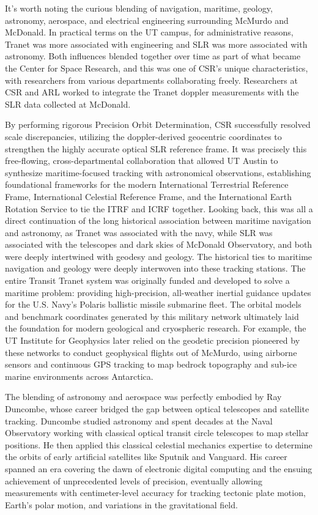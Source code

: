 It’s worth noting the curious blending of navigation, maritime, geology, astronomy, aerospace, and electrical engineering surrounding McMurdo and McDonald. In practical terms on the UT campus, for administrative reasons, Tranet was more associated with engineering and SLR was more associated with astronomy. Both influences blended together over time as part of what became the Center for Space Research, and this was one of CSR’s unique characteristics, with researchers from various departments collaborating freely. Researchers at CSR and ARL worked to integrate the Tranet doppler measurements with the SLR data collected at McDonald. 

By performing rigorous Precision Orbit Determination, CSR successfully resolved scale discrepancies, utilizing the doppler-derived geocentric coordinates to strengthen the highly accurate optical SLR reference frame. It was precisely this free-flowing, cross-departmental collaboration that allowed UT Austin to synthesize maritime-focused tracking with astronomical observations, establishing foundational frameworks for the modern International Terrestrial Reference Frame, International Celestial Reference Frame, and the International Earth Rotation Service to tie the ITRF and ICRF together.
Looking back, this was all a direct continuation of the long historical association between maritime navigation and astronomy, as Tranet was associated with the navy, while SLR was associated with the telescopes and dark skies of McDonald Observatory, and both were deeply intertwined with geodesy and geology. The historical ties to maritime navigation and geology were deeply interwoven into these tracking stations. The entire Transit Tranet system was originally funded and developed to solve a maritime problem: providing high-precision, all-weather inertial guidance updates for the U.S. Navy’s Polaris ballistic missile submarine fleet. The orbital models and benchmark coordinates generated by this military network ultimately laid the foundation for modern geological and cryospheric research. For example, the UT Institute for Geophysics later relied on the geodetic precision pioneered by these networks to conduct geophysical flights out of McMurdo, using airborne sensors and continuous GPS tracking to map bedrock topography and sub-ice marine environments across Antarctica.

The blending of astronomy and aerospace was perfectly embodied by Ray Duncombe, whose career bridged the gap between optical telescopes and satellite tracking. Duncombe studied astronomy and spent decades at the Naval Observatory working with classical optical transit circle telescopes to map stellar positions. He then applied this classical celestial mechanics expertise to determine the orbits of early artificial satellites like Sputnik and Vanguard. His career spanned an era covering the dawn of electronic digital computing and the ensuing achievement of unprecedented levels of precision, eventually allowing measurements with centimeter-level accuracy for tracking tectonic plate motion, Earth's polar motion, and variations in the gravitational field.

